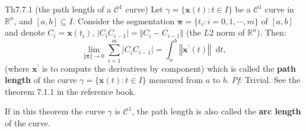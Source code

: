 \documentclass{article}
\newcommand{\dif}{\mathop{}\!\mathrm{d}}
\begin{document}
\begin{Th}{Th7.7.1 (the path length of a $\mathcal{C}^1$ curve)}
    Let $\gamma = \{\pmb{x}(t): t\in I\}$ be a $\mathcal{C}^1$ curve in $\mathbb{R}^n$, and $[a,b]\subseteq I$. Consider the segmentation $\pmb{\pi} = \{t_i: i = 0,1,\cdots,m\}$ of $[a, b]$ and denote $C_i = \pmb{x}(t_i)$, $|C_iC_{i-1}| = \Vert C_i - C_{i-1}\Vert$ (the $L2$ norm of $\mathbb{R}^n$). Then:
    $$\lim_{\Vert \pmb{\pi}\Vert\to 0}\sum_{i=1}^m |C_iC_{i-1}| = \int_a^b \left\Vert \pmb{x}^\prime(t) \right\Vert \dif t, $$
    \textcolor{Df}{(where $\pmb{x}^\prime$ is to compute the derivatives by component) which is called the \textbf{path length} of the curve $\gamma = \{\pmb{x}(t): t\in I\}$ measured from $a$ to $b$.}
    \tcblower
    \textit{Pf}: Trivial. See the theorem 7.1.1 in the reference book.
\end{Th}

\begin{Rmk}{}
    \textcolor{Df}{If in this theorem the curve $\gamma$ is $\mathcal{C}^1$, the path length is also called the \textbf{arc length} of the curve.}
\end{Rmk}
\end{document}
